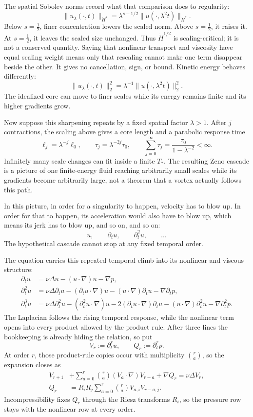 The spatial Sobolev norms record what that comparison does to regularity:
\[
 \|u_\lambda(\cdot,t)\|_{\dot H^s}
 =\lambda^{s-1/2}
  \|u(\cdot,\lambda^2t)\|_{\dot H^s}.
\]
Below \(s=\tfrac12\), finer concentration lowers the scaled norm.  Above
\(s=\tfrac12\), it raises it.  At \(s=\tfrac12\), it leaves the scaled size
unchanged.  Thus \(\dot H^{1/2}\) is scaling-critical; it is not a conserved
quantity.  Saying that nonlinear transport and viscosity have equal scaling
weight means only that rescaling cannot make one term disappear beside the
other.  It gives no cancellation, sign, or bound.  Kinetic energy behaves
differently:
\[
 \|u_\lambda(\cdot,t)\|_2^2
 =\lambda^{-1}\|u(\cdot,\lambda^2t)\|_2^2.
\]
The idealized core can move to finer scales while its energy remains finite
and its higher gradients grow.

Now suppose this sharpening repeats by a fixed spatial factor \(\lambda>1\).
After \(j\) contractions, the scaling above gives a core length and a
parabolic response time
\[
 \ell_j=\lambda^{-j}\ell_0,
 \qquad
 \tau_j=\lambda^{-2j}\tau_0,
 \qquad
 \sum_{j=0}^{\infty}\tau_j
 =\frac{\tau_0}{1-\lambda^{-2}}<\infty.
\]
Infinitely many scale changes can fit inside a finite \(T_*\).  The resulting
Zeno cascade is a picture of one finite-energy fluid reaching arbitrarily
small scales while its gradients become arbitrarily large, not a theorem that
a vortex actually follows this path.

In this picture, in order for a singularity to happen, velocity
has to blow up.  In order for that to happen, its acceleration would also have
to blow up, which means its jerk has to blow up, and so on, and so on:
\[
 u,\qquad \partial_tu,\qquad \partial_t^2u,\qquad\ldots
\]
The hypothetical cascade cannot stop at any fixed temporal order.

The equation carries this repeated temporal climb into its nonlinear and
viscous structure:
\[
\begin{aligned}
 \partial_tu
 &=\nu\Delta u-(u\!\cdot\nabla)u-\nabla p,\\
 \partial_t^2u
 &=\nu\Delta\partial_tu
   -(\partial_tu\!\cdot\nabla)u
   -(u\!\cdot\nabla)\partial_tu
   -\nabla\partial_tp,\\
 \partial_t^3u
 &=\nu\Delta\partial_t^2u
   -(\partial_t^2u\!\cdot\nabla)u
   -2(\partial_tu\!\cdot\nabla)\partial_tu
   -(u\!\cdot\nabla)\partial_t^2u
   -\nabla\partial_t^2p.
\end{aligned}
\]
The Laplacian follows the rising temporal response, while the nonlinear term
opens into every product allowed by the product rule.  After three lines the
bookkeeping is already hiding the relation, so put
\[
 V_r:=\partial_t^ru,
 \qquad
 Q_r:=\partial_t^rp.
\]
At order \(r\), those product-rule copies occur with multiplicity
\(\binom ra\), so the expansion closes as
\[
\begin{aligned}
 V_{r+1}
 &+\sum_{a=0}^{r}\binom ra
   (V_a\!\cdot\nabla)V_{r-a}
   +\nabla Q_r
   =\nu\Delta V_r,\\
 Q_r
 &=R_iR_j\sum_{a=0}^{r}\binom ra
   V_{a,i}V_{r-a,j}.
\end{aligned}
\]
Incompressibility fixes \(Q_r\) through the Riesz transforms \(R_i\), so the
pressure row stays with the nonlinear row at every order.

